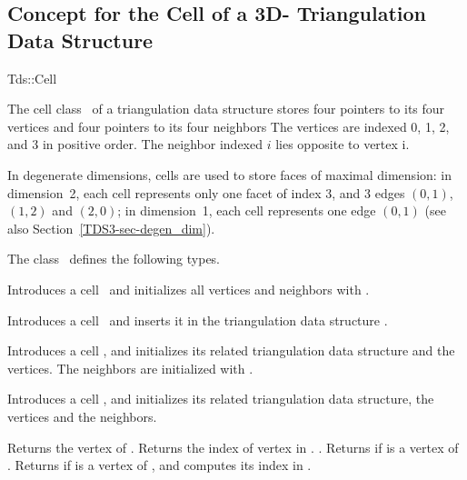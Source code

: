 	\subsection{Concept for the Cell of a 3D- Triangulation Data Structure} 
	\label{TDS3-sec-concept-Tds_Cell}

	\begin{ccClass}{Tds::Cell}


The cell class \ccClassName\ of a triangulation data structure stores
four pointers to its four vertices and four pointers to its four
neighbors The vertices are indexed 0, 1, 2, and 3 in positive order.
The neighbor indexed $i$ lies opposite to vertex i.

In degenerate dimensions, cells are used to store faces of maximal
dimension: in dimension~2, each cell represents only one
facet of index 3, and 3 edges $(0,1)$, $(1,2)$ and $(2,0)$; in
dimension~1, each cell represents one edge $(0,1)$ (see also
Section~\ref{TDS3-sec-degen_dim}). 

\ccTypes
{}
\ccThreeToTwo
The class \ccClassName\ defines the following types.

\ccGlue
{}

\ccCreation
{}

\ccConstructor{\ccClassName();}
{Introduces a cell \ccVar\ and initializes all vertices and neighbors 
 with .}

{Introduces a cell \ccVar\ and inserts it in the triangulation 
data structure .}

{Introduces a cell \ccVar, and initializes its related triangulation 
data structure and the vertices. The neighbors are initialized with
.} 

{Introduces a cell \ccVar, and initializes its related triangulation 
data structure, the vertices and the neighbors.}

\ccAccessFunctions

{Returns the vertex  of \ccVar.
}
\ccGlue
{}
{Returns the index of vertex  in \ccVar.
.}
\ccGlue
{}
{Returns  if   is a vertex of \ccVar.}
\ccGlue
{}
{Returns  if  is a vertex of \ccVar, and
computes its index  in \ccVar.}


\end{ccClass}
